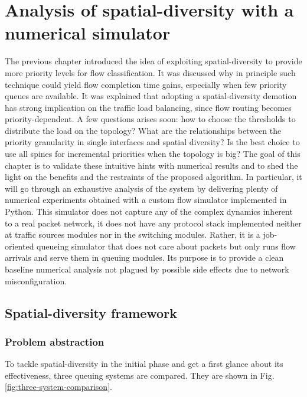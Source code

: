 \chapter{Analysis of spatial-diversity with a numerical simulator}
The previous chapter introduced the idea of exploiting spatial-diversity to provide more priority levels for flow classification. It was discussed why in principle such technique could yield flow completion time gains, especially when few priority queues are available. It was explained that adopting a spatial-diversity demotion has strong implication on the traffic load balancing, since flow routing becomes priority-dependent.  A few questions arises soon: how to choose the thresholds to distribute the load on the topology? What are the relationships between the priority granularity in 
single interfaces and spatial diversity? Is the best choice to use all spines for incremental priorities when the topology is big? The goal of this chapter is to validate these intuitive hints with numerical results and to shed the light on the benefits and the restraints of the proposed algorithm. In particular, it will go through an exhaustive analysis of the system by delivering plenty of numerical experiments obtained with a custom flow simulator implemented in Python. This simulator does not capture any of the complex dynamics inherent to a real packet network, it does not have any protocol stack implemented neither at traffic sources modules nor in the switching modules. Rather, it is a job-oriented queueing simulator that does not care about packets but only runs flow arrivals and serve them in queuing modules. Its purpose is to provide a clean baseline numerical analysis not plagued by possible side effects due to network misconfiguration.
\section{Spatial-diversity framework}

\subsection{Problem abstraction}
To tackle spatial-diversity in the initial phase and get a first glance about its effectiveness, three queuing systems are compared. They are shown in Fig.\ref{fig:three-system-comparison}. 

